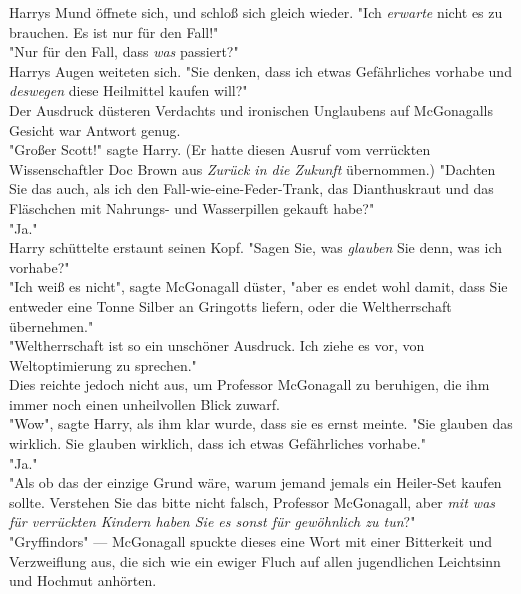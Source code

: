 {Harrys Mund öffnete sich, und schloß sich gleich wieder. "Ich \emph{erwarte} nicht es zu brauchen. Es ist nur für den Fall!"\\ "Nur für den Fall, dass \emph{was} passiert?"\\ Harrys Augen weiteten sich. "Sie denken, dass ich etwas Gefährliches vorhabe und \emph{deswegen} diese Heilmittel kaufen will?"\\ Der Ausdruck düsteren Verdachts und ironischen Unglaubens auf McGonagalls Gesicht war Antwort genug.\\ "Großer Scott!" sagte Harry. (Er hatte diesen Ausruf vom verrückten Wissenschaftler Doc Brown aus \emph{Zurück in die Zukunft} übernommen.) "Dachten Sie das auch, als ich den Fall-wie-eine-Feder-Trank, das Dianthuskraut und das Fläschchen mit Nahrungs- und Wasserpillen gekauft habe?"\\ "Ja."\\ Harry schüttelte erstaunt seinen Kopf. "Sagen Sie, was \emph{glauben} Sie denn, was ich vorhabe?"\\ "Ich weiß es nicht", sagte McGonagall düster, "aber es endet wohl damit, dass Sie entweder eine Tonne Silber an Gringotts liefern, oder die Weltherrschaft übernehmen."\\ "Weltherrschaft ist so ein unschöner Ausdruck. Ich ziehe es vor, von Weltoptimierung zu sprechen."\\ Dies reichte jedoch nicht aus, um Professor McGonagall zu beruhigen, die ihm immer noch einen unheilvollen Blick zuwarf.\\ "Wow", sagte Harry, als ihm klar wurde, dass sie es ernst meinte. "Sie glauben das wirklich. Sie glauben wirklich, dass ich etwas Gefährliches vorhabe."\\ "Ja."\\ "Als ob das der einzige Grund wäre, warum jemand jemals ein Heiler-Set kaufen sollte. Verstehen Sie das bitte nicht falsch, Professor McGonagall, aber \emph{mit was für verrückten Kindern haben Sie es sonst für gewöhnlich zu tun}?"\\ "Gryffindors" --- McGonagall spuckte dieses eine Wort mit einer Bitterkeit und Verzweiflung aus, die sich wie ein ewiger Fluch auf allen jugendlichen Leichtsinn und Hochmut anhörten.

}
